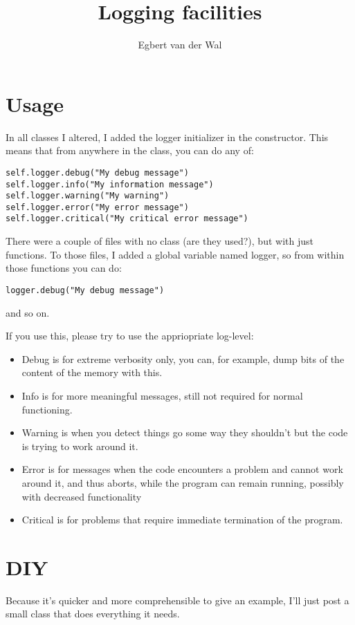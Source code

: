 \documentclass[a4paper, 10pt, oneside]{article}
\title{Logging facilities}
\author{Egbert van der Wal}
\begin{document}
\maketitle

\section{Usage}
In all classes I altered, I added the logger initializer in the constructor. This means that from anywhere in the class, you can do any of:

\begin{lstlisting}
self.logger.debug("My debug message")
self.logger.info("My information message")
self.logger.warning("My warning")
self.logger.error("My error message")
self.logger.critical("My critical error message")
\end{lstlisting}

There were a couple of files with no class (are they used?), but with just functions. To those files, I added a global variable named logger, so from within those functions you can do:

\begin{lstlisting}
logger.debug("My debug message")
\end{lstlisting}

and so on.


If you use this, please try to use the appriopriate log-level:
\begin{itemize}
\item Debug is for extreme verbosity only, you can, for example, dump bits of the content of the memory with this.
\item Info is for more meaningful messages, still not required for normal functioning.
\item Warning is when you detect things go some way they shouldn't but the code is trying to work around it.
\item Error is for messages when the code encounters a problem and cannot work around it, and thus aborts, while the program can remain running, possibly with decreased functionality
\item Critical is for problems that require immediate termination of the program.
\end{itemize}


\section{DIY}
Because it's quicker and more comprehensible to give an example, I'll just post a small class that does everything it needs.
\end{document}
